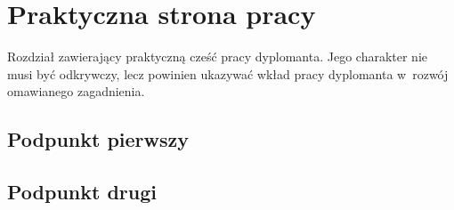 \chapter{Praktyczna strona pracy}
\label{cha:rozdzialTrzeci}

Rozdział zawierający praktyczną cześć pracy dyplomanta. Jego charakter nie musi być odkrywczy, lecz powinien ukazywać wkład pracy dyplomanta w~rozwój omawianego zagadnienia.

\section{Podpunkt pierwszy}
\label{sec:podpunkt_pierwszy}
\lipsum[34-35]

\section{Podpunkt drugi}
\label{sec:podpunkt_drugi}
\lipsum[100-102]